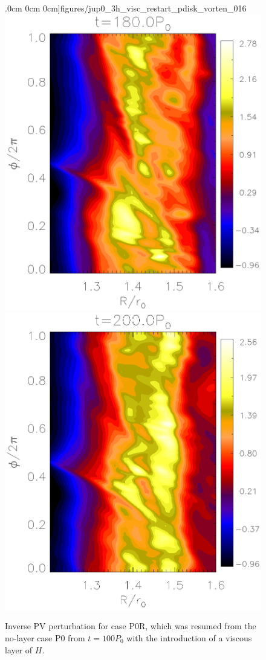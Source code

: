 \begin{figure}
    .0cm 0cm 0cm]{figures/jup0_3h_visc_restart_pdisk_vorten_016}\includegraphics[scale=.43,clip=true,trim=2.3cm
    .0cm 0cm 0cm]{figures/jup0_3h_visc_restart_pdisk_vorten_018}\includegraphics[scale=.43,clip=true,trim=2.3cm
    .0cm 0cm 0cm]{figures/jup0_3h_visc_restart_pdisk_vorten_020}
  \caption{Inverse PV perturbation for case P0R, which was resumed
    from the no-layer case P0 from $t=100P_0$ with the introduction of
    a viscous layer of $H$. 
    \label{jup0_3h_visc_restart_vorten}}
\end{figure}
